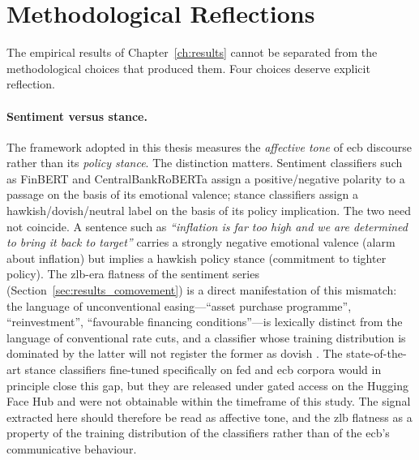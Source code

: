 \section{Methodological Reflections}
\label{sec:methodological_reflections}

The empirical results of Chapter~\ref{ch:results} cannot be separated from the methodological choices that produced them. Four choices deserve explicit reflection.

\paragraph{Sentiment versus stance.} The framework adopted in this thesis measures the \emph{affective tone} of \gls{ecb} discourse rather than its \emph{policy stance}. The distinction matters. Sentiment classifiers such as FinBERT \cite{araci2019finbert} and CentralBankRoBERTa \cite{Pfeifer2023} assign a positive/negative polarity to a passage on the basis of its emotional valence; stance classifiers assign a hawkish/dovish/neutral label on the basis of its policy implication. The two need not coincide. A sentence such as \textit{``inflation is far too high and we are determined to bring it back to target''} carries a strongly negative emotional valence (alarm about inflation) but implies a hawkish policy stance (commitment to tighter policy). The \gls{zlb}-era flatness of the sentiment series (Section~\ref{sec:results_comovement}) is a direct manifestation of this mismatch: the language of unconventional easing---``asset purchase programme'', ``reinvestment'', ``favourable financing conditions''---is lexically distinct from the language of conventional rate cuts, and a classifier whose training distribution is dominated by the latter will not register the former as dovish \cite{xing2020financial}. The state-of-the-art stance classifiers fine-tuned specifically on \gls{fed} and \gls{ecb} corpora \cite{shah2023trillion, shah2025wcb} would in principle close this gap, but they are released under gated access on the Hugging Face Hub and were not obtainable within the timeframe of this study. The signal extracted here should therefore be read as affective tone, and the \gls{zlb} flatness as a property of the training distribution of the classifiers rather than of the
\gls{ecb}'s communicative behaviour.

